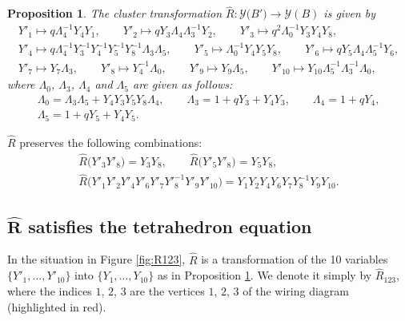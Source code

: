 \documentclass[pdftex]{sigma}
\numberwithin{equation}{section}
\newtheorem{Proposition}[Theorem]{Proposition}
 { \theoremstyle{definition}
\newtheorem{Example}[Theorem]{Example}
\newtheorem{Remark}[Theorem]{Remark} }
\begin{document}
\begin{Proposition}\label{pr:RY}
The cluster transformation $\widehat{R}\colon \mathcal{Y}\bigl(B'\bigr) \rightarrow \mathcal{Y}(B)$ is given by
\begin{gather*}
Y'_1 \mapsto q\Lambda^{-1}_4Y_4Y_1,\qquad
Y'_2 \mapsto qY_3\Lambda_4\Lambda^{-1}_3Y_2,
\qquad
Y'_3 \mapsto q^2 \Lambda^{-1}_0Y_3Y_4Y_8,
\\
Y'_4 \mapsto q\Lambda^{-1}_4Y^{-1}_3Y^{-1}_4Y^{-1}_5Y^{-1}_8\Lambda_3\Lambda_5,
\qquad
Y'_5 \mapsto \Lambda^{-1}_0 Y_4Y_5Y_8,
\qquad
Y'_6 \mapsto q Y_5 \Lambda_4\Lambda^{-1}_5Y_6,
\\
Y'_7 \mapsto Y_7\Lambda_3,
\qquad
Y'_8 \mapsto Y^{-1}_4\Lambda_0,
\qquad
Y'_9 \mapsto Y_9\Lambda_5,
\qquad
Y'_{10} \mapsto Y_{10}\Lambda^{-1}_5\Lambda^{-1}_3\Lambda_0,
\end{gather*}
where $\Lambda_0$, $\Lambda_3$, $\Lambda_4$ and $\Lambda_5$ are given
as follows:
\begin{gather*}
\Lambda_0 = \Lambda_3\Lambda_5 + Y_4Y_3Y_5Y_8\Lambda_4,\qquad
\Lambda_3 = 1+qY_3+Y_4Y_3,\qquad
\Lambda_4 = 1 + q Y_4, \\
\Lambda_5 = 1+qY_5+Y_4Y_5.
\end{gather*}
\end{Proposition}

\begin{Remark}\label{re:c2}
$\widehat{R}$ preserves the following combinations:
\begin{gather*}
\widehat{R}\bigl(Y'_3Y'_8\bigr) = Y_3Y_8,
\qquad
\widehat{R}\bigl(Y'_5Y'_8\bigr) = Y_5Y_8,
\\
\widehat{R}\bigl(Y'_1Y'_2Y'_4Y'_6Y'_7Y'^{-1}_8Y'_9Y'_{10}\bigr) =
Y_1Y_2Y_4Y_6Y_7Y^{-1}_8Y_9Y_{10}.
\end{gather*}
\end{Remark}

\subsection[R satisfies the tetrahedron equation]{$\boldsymbol{\widehat{R}}$ satisfies the tetrahedron equation}

In the situation in Figure \ref{fig:R123}, $\widehat{R}$ is a
transformation of the 10 variables $\{Y'_1,\dotsc, Y'_{10}\}$ into
$\{Y_1,\dotsc, Y_{10}\}$ as in Proposition \ref{pr:RY}. We denote it
simply by $\widehat{R}_{123}$, where the indices $1$, $2$, $3$ are the
vertices $1$, $2$, $3$ of the wiring diagram (highlighted in red).
\end{document}

